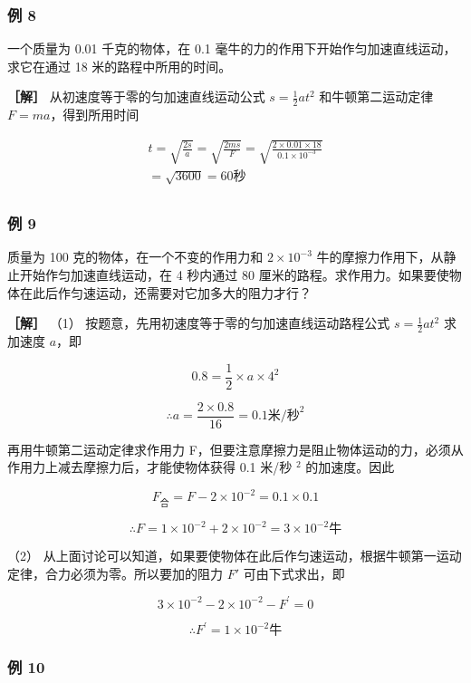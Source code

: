 \subsubsection{例 8}\label{ux4f8b-8-3}

一个质量为 0.01 千克的物体，在 0.1
毫牛的力的作用下开始作匀加速直线运动，求它在通过 18
米的路程中所用的时间。

\textbf{［解］} 从初速度等于零的匀加速直线运动公式
\(s = \frac{1}{2} at^2\) 和牛顿第二运动定律 \(F = ma\)，得到所用时间

\[
\begin{array}{l} t = \sqrt {\frac {2 s}{a}} = \sqrt {\frac {2 m s}{F}} = \sqrt {\frac {2 \times 0.01 \times 18}{0.1 \times 10 ^ {- 3}}} \\ = \sqrt {3600} = 60 \text{秒} \\ \end{array}
\]

\subsubsection{例 9}\label{ux4f8b-9-3}

质量为 100 克的物体，在一个不变的作用力和 \(2 \times 10^{-3}\)
牛的摩擦力作用下，从静止开始作匀加速直线运动，在 4 秒内通过 80
厘米的路程。求作用力。如果要使物体在此后作匀速运动，还需要对它加多大的阻力才行？

\textbf{［解］} （1） 按题意，先用初速度等于零的匀加速直线运动路程公式
\(s = \frac{1}{2} at^2\) 求加速度 \(a\)，即

\[
0.8 = \frac {1}{2} \times a \times 4 ^ {2}
\]

\[
\therefore a = \frac {2 \times 0.8}{16} = 0.1 \text{米/秒} ^ {2}
\]

再用牛顿第二运动定律求作用力
F，但要注意摩擦力是阻止物体运动的力，必须从作用力上减去摩擦力后，才能使物体获得
0.1 米/秒 \(^{2}\) 的加速度。因此

\[
F _ {\text{合}} = F - 2 \times 10 ^ {- 2} = 0.1 \times 0.1
\]

\[
\therefore F = 1 \times 10 ^ {- 2} + 2 \times 10 ^ {- 2} = 3 \times 10 ^ {- 2} \text{牛}
\]

（2）
从上面讨论可以知道，如果要使物体在此后作匀速运动，根据牛顿第一运动定律，合力必须为零。所以要加的阻力
\(F'\) 可由下式求出，即

\[
3 \times 10 ^ {- 2} - 2 \times 10 ^ {- 2} - F ^ {\prime} = 0
\]

\[
\therefore F ^ {\prime} = 1 \times 10 ^ {- 2} \text{牛}
\]

\subsubsection{例 10}\label{ux4f8b-10-2}

